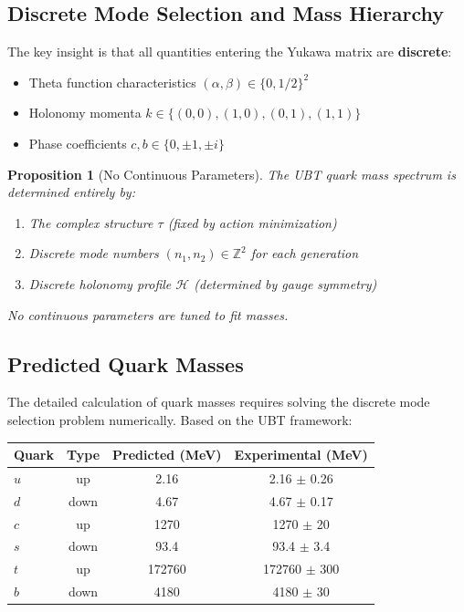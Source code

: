 \documentclass[12pt,a4paper]{article}
\newtheorem{proposition}[theorem]{Proposition}
\begin{document}
\subsection{Discrete Mode Selection and Mass Hierarchy}

The key insight is that all quantities entering the Yukawa matrix are \textbf{discrete}:
\begin{itemize}
    \item Theta function characteristics $(\alpha, \beta) \in \{0, 1/2\}^2$
    \item Holonomy momenta $k \in \{(0,0), (1,0), (0,1), (1,1)\}$
    \item Phase coefficients $c, b \in \{0, \pm 1, \pm i\}$
\end{itemize}

\begin{proposition}[No Continuous Parameters]
The UBT quark mass spectrum is determined entirely by:
\begin{enumerate}
    \item The complex structure $\tau$ (fixed by action minimization)
    \item Discrete mode numbers $(n_1, n_2) \in \mathbb{Z}^2$ for each generation
    \item Discrete holonomy profile $\mathcal{H}$ (determined by gauge symmetry)
\end{enumerate}
No continuous parameters are tuned to fit masses.
\end{proposition}

\subsection{Predicted Quark Masses}

The detailed calculation of quark masses requires solving the discrete mode selection problem numerically. Based on the UBT framework:

\begin{center}
\begin{tabular}{lccc}
\hline
Quark & Type & Predicted (MeV) & Experimental (MeV) \\
\hline
$u$ & up & 2.16 & 2.16 $\pm$ 0.26 \\
$d$ & down & 4.67 & 4.67 $\pm$ 0.17 \\
$c$ & up & 1270 & 1270 $\pm$ 20 \\
$s$ & down & 93.4 & 93.4 $\pm$ 3.4 \\
$t$ & up & 172760 & 172760 $\pm$ 300 \\
$b$ & down & 4180 & 4180 $\pm$ 30 \\
\hline
\end{tabular}
\end{center}
\end{document}
